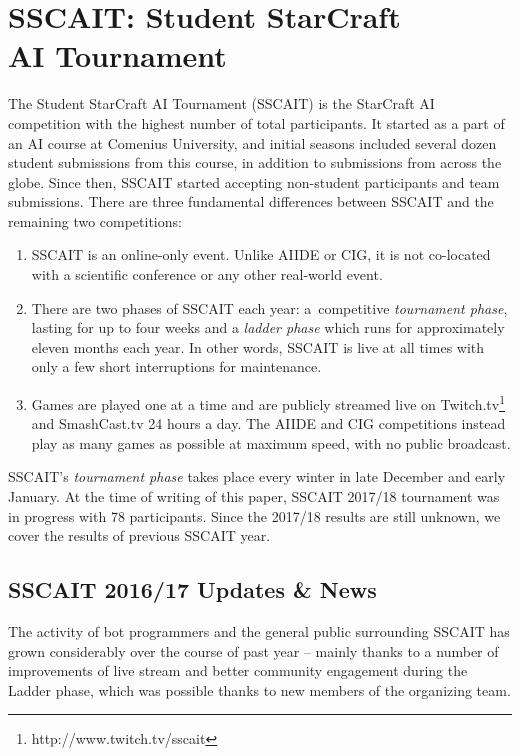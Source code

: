 \section{SSCAIT: Student StarCraft\\ AI Tournament}\label{subsecSSCAIT}

The Student StarCraft AI Tournament (SSCAIT) is the StarCraft AI competition with the highest number of total participants. It started as a part of an AI course at Comenius University, and initial seasons included several dozen student submissions from this course, in addition to submissions from across the globe. Since then, SSCAIT started accepting non-student participants and team submissions. There are three fundamental differences between SSCAIT and the remaining two competitions:
\begin{enumerate}
  \item SSCAIT is an online-only event. Unlike AIIDE or CIG, it is not co-located with a scientific conference or any other real-world event. \item There are two phases of SSCAIT each year: a~competitive {\em tournament phase}, lasting for up to four weeks and a {\em ladder phase} which runs for approximately eleven months each year. In other words, SSCAIT is live at all times with only a 
few short interruptions for maintenance.
  \item Games are played one at a time and are publicly streamed live on Twitch.tv\footnote{http://www.twitch.tv/sscait} and SmashCast.tv 24 hours a day. The AIIDE and CIG competitions instead play as many games as possible at maximum speed, with no public broadcast.
\end{enumerate}

\vskip 3mm

SSCAIT's {\em tournament phase} takes place every winter in late December and early January. At the time of writing of this paper, SSCAIT 2017/18 tournament was in progress with 78 participants. Since the 2017/18 results are still unknown, we cover the results of previous SSCAIT year.

\subsection*{SSCAIT 2016/17 Updates \& News}\label{subsecSSCAITnews}

The activity of bot programmers and the general public surrounding SSCAIT has grown considerably over the course of past year -- mainly thanks to a number of improvements of live stream and better community engagement during the Ladder phase, which was possible thanks to new members of the organizing team.

